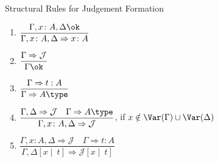 Structural Rules for Judgement Formation
\begin{enumerate}
    \item[\textsc{Ass}] $\dfrac{
        \Gamma, x \colon A, \Delta \ok
    }{
        \Gamma, x \colon A, \Delta 
        \Rightarrow 
        x \colon A
    }$ 
    \item[\textsc{Reflection1}] $\dfrac{
        \Gamma \Rightarrow \mathcal{J}
    }{
        \Gamma \ok
    }$
    \item[\textsc{Reflection2}] $\dfrac{
        \Gamma \Rightarrow t : A
    }{
        \Gamma \Rightarrow A \type
    }$
    \item[\textsc{Thin}] $\dfrac{
        \Gamma, \Delta \Rightarrow \mathcal{J}
        \quad
        \Gamma \Rightarrow A \type   
    }{
        \Gamma, x \colon A, \Delta 
        \Rightarrow 
        \mathcal{J}
    }$, if $x \notin \Var(\Gamma) \cup \Var(\Delta)$
    \item[\textsc{Sub}] $\dfrac{
        \Gamma, x \colon A, \Delta \Rightarrow \mathcal{J}
        \quad
        \Gamma \Rightarrow t : A  
    }{
        \Gamma, \Delta[x \mid\ t] 
        \Rightarrow
        \mathcal{J}[x \mid\ t]
    }$
\end{enumerate}

